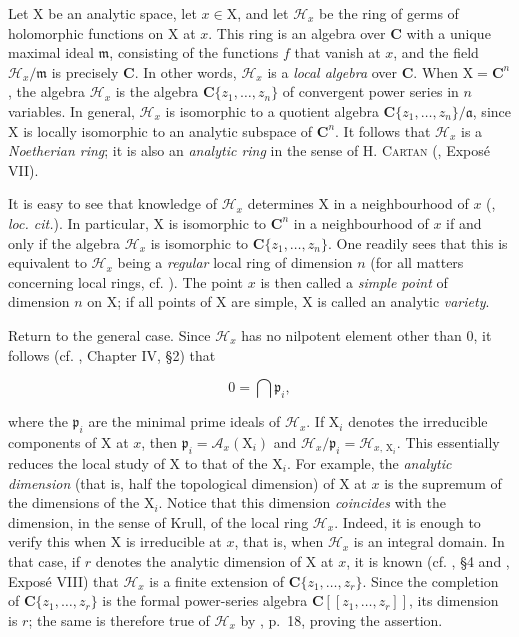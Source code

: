 Let $\mathrm{X}$ be an analytic space, let $x\in\mathrm{X}$, and let $\mathcal{H}_x$ be the ring of germs of holomorphic functions on $\mathrm{X}$ at $x$. This ring is an algebra over $\mathbf{C}$ with a unique maximal ideal $\mathfrak{m}$, consisting of the functions $f$ that vanish at $x$, and the field $\mathcal{H}_x/\mathfrak{m}$ is precisely $\mathbf{C}$. In other words, $\mathcal{H}_x$ is a \emph{local algebra} over $\mathbf{C}$. When $\mathrm{X}=\mathbf{C}^n$, the algebra $\mathcal{H}_x$ is the algebra $\mathbf{C}\{z_1,\ldots,z_n\}$ of convergent power series in $n$ variables. In general, $\mathcal{H}_x$ is isomorphic to a quotient algebra $\mathbf{C}\{z_1,\ldots,z_n\}/\mathfrak{a}$, since $\mathrm{X}$ is locally isomorphic to an analytic subspace of $\mathbf{C}^n$. It follows that $\mathcal{H}_x$ is a \emph{Noetherian ring}; it is also an \emph{analytic ring} in the sense of H. \textsc{Cartan} (, Expos\'e VII).

It is easy to see that knowledge of $\mathcal{H}_x$ determines $\mathrm{X}$ in a neighbourhood of $x$ (, \emph{loc. cit.}). In particular, $\mathrm{X}$ is isomorphic to $\mathbf{C}^n$ in a neighbourhood of $x$ if and only if the algebra $\mathcal{H}_x$ is isomorphic to $\mathbf{C}\{z_1,\ldots,z_n\}$. One readily sees that this is equivalent to $\mathcal{H}_x$ being a \emph{regular} local ring of dimension $n$ (for all matters concerning local rings, cf. ). The point $x$ is then called a \emph{simple point} of dimension $n$ on $\mathrm{X}$; if all points of $\mathrm{X}$ are simple, $\mathrm{X}$ is called an analytic \emph{variety}.

Return to the general case. Since $\mathcal{H}_x$ has no nilpotent element other than $0$, it follows (cf. , Chapter IV, \S 2) that

\begin{equation*}
0=\bigcap\mathfrak{p}_i,
\end{equation*}

where the $\mathfrak{p}_i$ are the minimal prime ideals of $\mathcal{H}_x$. If $\mathrm{X}_i$ denotes the irreducible components of $\mathrm{X}$ at $x$, then $\mathfrak{p}_i=\mathcal{A}_x(\mathrm{X}_i)$ and $\mathcal{H}_x/\mathfrak{p}_i=\mathcal{H}_{x,\,\mathrm{X}_i}$. This essentially reduces the local study of $\mathrm{X}$ to that of the $\mathrm{X}_i$. For example, the \emph{analytic dimension} (that is, half the topological dimension) of $\mathrm{X}$ at $x$ is the supremum of the dimensions of the $\mathrm{X}_i$. Notice that this dimension \emph{coincides} with the dimension, in the sense of Krull, of the local ring $\mathcal{H}_x$. Indeed, it is enough to verify this when $\mathrm{X}$ is irreducible at $x$, that is, when $\mathcal{H}_x$ is an integral domain. In that case, if $r$ denotes the analytic dimension of $\mathrm{X}$ at $x$, it is known (cf. , \S 4 and , Expos\'e VIII) that $\mathcal{H}_x$ is a finite extension of $\mathbf{C}\{z_1,\ldots,z_r\}$. Since the completion of $\mathbf{C}\{z_1,\ldots,z_r\}$ is the formal power-series algebra $\mathbf{C}[[z_1,\ldots,z_r]]$, its dimension is $r$; the same is therefore true of $\mathcal{H}_x$ by , p.~18, proving the assertion.
